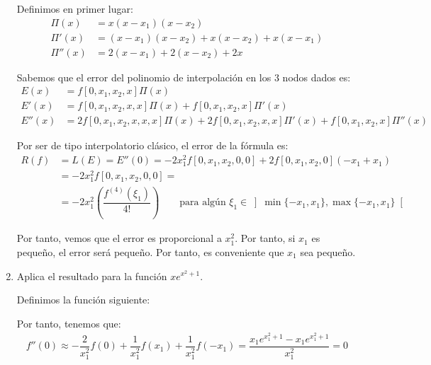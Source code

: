\begin{ejercicio}[DGIIM 2023/2024]
\begin{enumerate}
        Definimos en primer lugar:
        \begin{align*}
            \Pi(x) &= x(x-x_1)(x-x_2)\\
            \Pi'(x) &= (x-x_1)(x-x_2) + x(x-x_2) + x(x-x_1)\\
            \Pi''(x) &= 2(x-x_1) + 2(x-x_2) + 2x
        \end{align*}

        Sabemos que el error del polinomio de interpolación en los $3$ nodos dados es:
        \begin{align*}
            E(x) &= f[0, x_1, x_2, x]\Pi(x)\\
            E'(x) &= f[0, x_1, x_2, x, x]\Pi(x) + f[0, x_1, x_2, x]\Pi'(x)\\
            E''(x) &= 2f[0, x_1, x_2, x, x, x]\Pi(x) + 2f[0, x_1, x_2, x, x]\Pi'(x) + f[0, x_1, x_2, x]\Pi''(x)
        \end{align*}

        Por ser de tipo interpolatorio clásico, el error de la fórmula es:
        \begin{align*}
            R(f) &= L(E) = E''(0) = -2x_1^2f[0, x_1, x_2, 0, 0]+2f[0, x_1, x_2, 0]\left(-x_1+x_1\right)\\
            &= -2x_1^2f[0, x_1, x_2, 0, 0]=\\&= -2x_1^2\left(\dfrac{f^{(4)}(\xi_1)}{4!}\right)\qquad \text{para algún }\xi_1\in\left]\min\{-x_1,x_1\},\max\{-x_1,x_1\}\right[
        \end{align*}

    
        Por tanto, vemos que el error es proporcional a $x_1^2$. Por tanto, si $x_1$ es pequeño, el error será pequeño. Por tanto, es conveniente que $x_1$ sea pequeño.
        
        \item Aplica el resultado para la función $x e^{x^2 + 1}$.
        
        Definimos la función siguiente:

        Por tanto, tenemos que:
        \begin{align*}
            f''(0)\approx -\dfrac{2}{x_1^2}f(0) + \dfrac{1}{x_1^2}f(x_1) + \dfrac{1}{x_1^2}f(-x_1)
            = \dfrac{x_1e^{x_1^2+1}-x_1e^{x_1^2+1}}{x_1^2}=0
        \end{align*}
        
    \end{enumerate}
\end{ejercicio}

